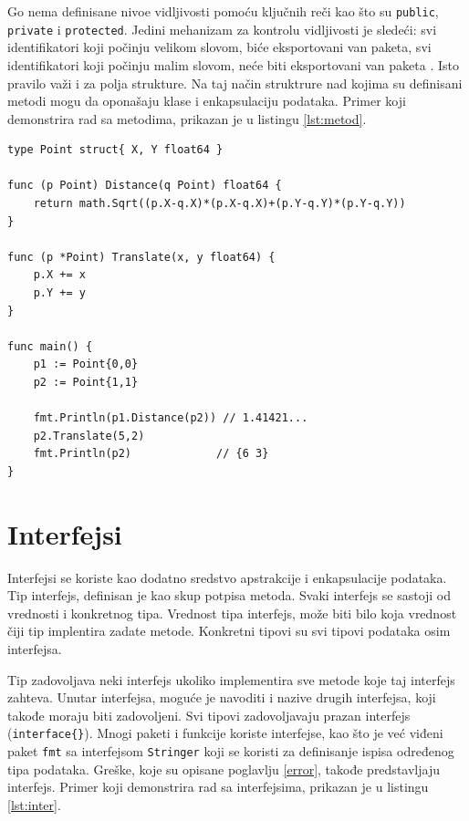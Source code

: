 \documentclass[12pt,oneside]{memoir}
\begin{document}
Go nema definisane nivoe vidljivosti  pomoću ključnih reči kao što su \texttt{public}, \texttt{private} i \texttt{protected}. Jedini mehanizam za kontrolu vidljivosti je sledeći: svi identifikatori koji počinju velikom slovom, biće eksportovani van paketa, svi identifikatori koji počinju malim slovom, neće biti eksportovani van paketa \cite{bookGoProg}. Isto pravilo važi i za polja strukture. Na taj način struktrure nad kojima su definisani metodi mogu da oponašaju klase i enkapsulaciju podataka. Primer koji demonstrira rad sa metodima, prikazan je u listingu \ref{lst:metod}.

\begin{center}
\begin{lstlisting}[caption=Primer koji demonstrira rad sa metodima, label={lst:metod},  backgroundcolor=\color{background}]
type Point struct{ X, Y float64 }

func (p Point) Distance(q Point) float64 {
	return math.Sqrt((p.X-q.X)*(p.X-q.X)+(p.Y-q.Y)*(p.Y-q.Y))
}

func (p *Point) Translate(x, y float64) {
	p.X += x
	p.Y += y
}

func main() {
	p1 := Point{0,0}
	p2 := Point{1,1}

	fmt.Println(p1.Distance(p2)) // 1.41421...
	p2.Translate(5,2)
	fmt.Println(p2)				// {6 3}
}
\end{lstlisting}
\end{center}

\section{Interfejsi}

Interfejsi se koriste kao dodatno sredstvo apstrakcije i enkapsulacije podataka. Tip interfejs, definisan je kao skup potpisa metoda. Svaki interfejs se sastoji od vrednosti i konkretnog tipa. Vrednost tipa interfejs, može biti bilo koja vrednost čiji tip implentira zadate metode. Konkretni tipovi su svi tipovi podataka osim interfejsa.

Tip zadovoljava neki interfejs ukoliko implementira sve metode koje taj interfejs zahteva. Unutar interfejsa, moguće je navoditi i nazive drugih interfejsa, koji takođe moraju biti zadovoljeni. Svi tipovi zadovoljavaju prazan interfejs (\texttt{interface\{\}}). Mnogi paketi i funkcije koriste interfejse, kao što je već viđeni paket \texttt{fmt} sa interfejsom \texttt{Stringer} koji se koristi za definisanje ispisa određenog tipa podataka. Greške, koje su opisane poglavlju \ref{error}, takođe predstavljaju interfejs. Primer koji demonstrira rad sa interfejsima, prikazan je u listingu \ref{lst:inter}.
\end{document}
